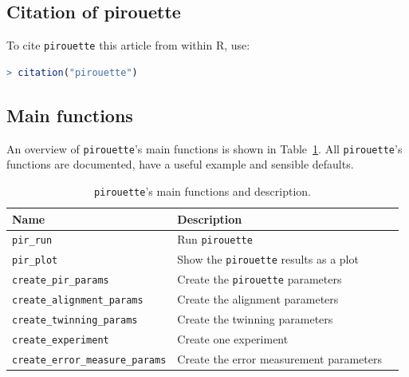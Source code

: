 \subsection{Citation of pirouette}
\label{subsec:citation}

To cite \verb;pirouette; this article from within R, use:

\begin{lstlisting}[language=R]
> citation("pirouette")
\end{lstlisting}

\subsection{Main functions}
\label{subsec:main_functions}

An overview of \verb;pirouette;'s main functions is shown in 
Table~\ref{tab:functions}. 
All \verb;pirouette;'s functions are documented,
have a useful example and sensible defaults.

\begin{table}[h]
  \centering
  \begin{tabular}{ | l | l | l | }
    \hline
    \textbf{Name} & \textbf{Description} \\
    \hline
    \verb;pir_run; & Run \verb;pirouette; \\
    \verb;pir_plot; & Show the \verb;pirouette; results as a plot  \\
    \verb;create_pir_params; & Create the \verb;pirouette; parameters  \\
    \hline
    \verb;create_alignment_params; & Create the alignment parameters  \\
    \verb;create_twinning_params; & Create the twinning parameters  \\
    \verb;create_experiment; & Create one experiment  \\
    \verb;create_error_measure_params; & Create the error measurement parameters  \\
    \hline
  \end{tabular}
  \caption{
    \texttt{pirouette}'s main functions and description. 
  }
  \label{tab:functions}
\end{table}

